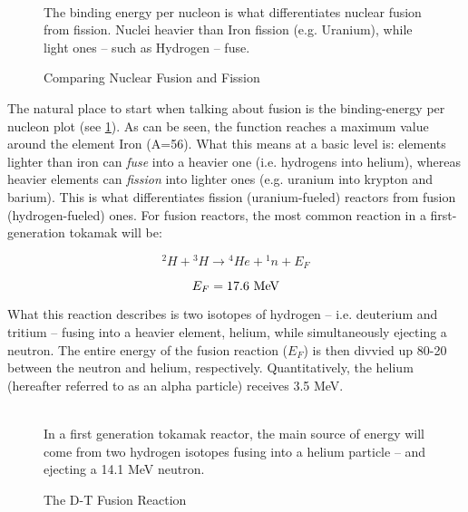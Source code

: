 \begin{figure}
	\centering
	\begin{adjustbox}{width=0.75\textwidth}
		
	\end{adjustbox}
	\caption{Comparing Nuclear Fusion and Fission} ~\\
	\small The binding energy per nucleon is what differentiates nuclear fusion from fission. Nuclei heavier than Iron fission (e.g. Uranium), while light ones -- such as Hydrogen -- fuse. 
	\label{fig:binding_energy}
\end{figure}

The natural place to start when talking about fusion is the binding-energy per nucleon plot (see \cref{fig:binding_energy}). As can be seen, the function reaches a maximum value around the element Iron (A=56). What this means at a basic level is: elements lighter than iron can \emph{fuse} into a heavier one (i.e. hydrogens into helium), whereas heavier elements can \emph{fission} into lighter ones (e.g. uranium into krypton and barium). This is what differentiates fission (uranium-fueled) reactors from fusion (hydrogen-fueled) ones. For fusion reactors, the most common reaction in a first-generation tokamak will be:

\begin{equation}
	{}^2H+ {}^3H \rightarrow {}^4 He + {}^1 n + E_F
\end{equation}

\begin{equation}
	E_F = 17.6 \ \textnormal{MeV}
\end{equation}

What this reaction describes is two isotopes of hydrogen -- i.e. deuterium and tritium -- fusing into a heavier element, helium, while simultaneously ejecting a neutron. The entire energy of the fusion reaction ($E_F$) is then divvied up 80-20 between the neutron and helium, respectively. Quantitatively, the helium (hereafter referred to as an alpha particle) receives 3.5 MeV.

\begin{figure}
	\centering
	\begin{adjustbox}{width=0.75\textwidth}
		
	\end{adjustbox}
	\caption{The D-T Fusion Reaction} ~\\
	\small In a first generation tokamak reactor, the main source of energy will come from two hydrogen isotopes fusing into a helium particle -- and ejecting a 14.1 MeV neutron.
\end{figure}

